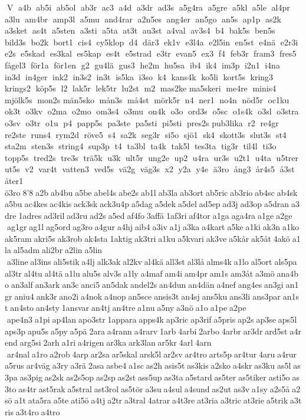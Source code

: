 V  a4b  ab5i  ab5ol  ab3r  ac3  a4d  a3dr  ad3s  a5g4ra  a5gre  a5kl  a5le  al4pr  a3lu  am4br  amp3l  a5mu  and4rar  a2n5es  ang4er  an5go  an5s  ap1p  as2k  a3sket  as4t  a5sten  a3sti  a5ta  at3t  au3st  a4val  av3s4  b4  bak5s  ben5s  bild3s  bo2k  bort1  cis4  cy5klop  d4  där3  ek1v  e3l4a  e2l5in  en5st  e4nä  e2r3i  e2s  e5skad  es3kal  es5kap  es4t  e5strad  e3tr  evan5  ex3  f4  feb3r  fram3  fres5  fågel3  för1a  för1en  g2  gu4lä  gus3  he2m  hu5sa  ib4  ik4  im3p  i2n1  i4na  in3d  in4ger  ink2  in3s2  in3t  is5ka  i3so  k4  kans4k  ko5li  kort5s  kring3  krings2  köp5s  l2  lak5r  lek5tr  lu2st  m2  mas2ke 	 ma5skeri  me4re  minis4 	 mjölk5s  mon2s 	 män5sko  mån3s  må4st  mörk5r  n4  ner1  no4n  nöd5r  oc1ku  ok3t  o3kv  o2ma  o2mo  om3s4  o3mu  on4k  o3o  ord3s  o5sc  o1s4k  o3sl  o3stra  o3sv  o3tr  o1u  p4  papp5s  pa3ste  pa5sti  pi5sti  pres2s 	 pub3lika  r2  re4gr  re2ste  runs4  rym2d  röve5  s4  sa2k  seg3r  si5o  sjö1  sk4  skott3s  slut3s  st4  sta2m  sten3s  string4  sup3p  t4  ta3bl  ta4k  tak5l  tes3ta  tig3r  til4l  ti3o  topp5s  tred2s  tre3s  trä5k  u3k  ult5r  ung2e  up2  u4ra  ur3s  u2t1  u4ta  u5trer  ut5s  v2  var4t  vatten3  ved5s  vä2g  väg3s  x2  y2a  y4e  ä3ro  ång3  år4s5  å3st  åter1  ö3ro 8'8 a2b ab4bu a5be abel4s abe2s ab1l ab3la ab3ort ab5ric ab3rio ab4sc ab4sk a5bu ac4kes ac4kis ack3sk ack3u4p a5dag a5dek a5del ad5ep ad3j ad3op a5dran a3dre 1adres ad3ril ad3ru ad2s a5ed af4fo 3affä 1af3ri af4tor a1ga aga4ra a1ge a2ge  ag1gr ag1l ag5ord ag3ro a4gur a4hj aib4 a3iv a1j a3ka a4kart a5ke a1ki ak3n a1ko ak5ram akri5s ak3rob ak4sta 1aktig ak3tri a1ku a5kvari ak3ve a5kår ak5åt 4akö a1la al5adm ali2br a2lin a5lin  a3line al3ins ali5stik a4lj alk3ak al2kv al4kä all3st al3lå alms4k a1lo al5ort als5pa al3tr al4tu al4tä a1lu alu5s alv3s a1ly a4maf am4i am4pr am1s am3åt a3mö ana4bo an3alf an3ark an3c anci5 an5dak andel2s an4dun an4dän a4nef ang4es an3gi an1gr aniu4 ank3r ano2i a4nok a4nop an5sce ansis3t an4sj ans5ku ans3li ans3par an1st an4sto an4sty 1ansvar an4tj an4tre a1nu a5ny a3nö a1o a1pe a2pe  ape4n3 a1pi ap4lan apo3str 1appara apps4k ap3ric ap3rif a5pris ap2s ap3se aps5l aps3p apu5s a5py a5pä 2ara a4rann a4rarv 1arb 4arbi 2arbo 4arbr ar3dr ard5st a4rend arg5si 2arh a1ri a4rigen ar3ka ark3lan ar5kr 4arl 4arn  ar4nal a1ro a2rob 4arp ar2sa ar5skal arsk5l ar2sv ar4tro arts5p ar4tur 4aru a4rur a5rus ar4väg a3ry a3rä 2asa asbe4 a1sc as2h asis5t as3kis a2sko a4skr as3ku as5l as3pa as3pig as2sk as2s5op as2sp as2st ass5up as3ta a5stard as5ter as5tiker asti5o as3to as4tr ast5rak a5stral ast3rol as5tör a3su a4sul a4sund as2ut as3v a1sy a2s5å a2sö a1t ata5ra a5te ati5ö a4tj a2tr a3tral 4atrar a4t3re at3ria a3tric at3rie a5trik a3tris a3t4ro a4tro 